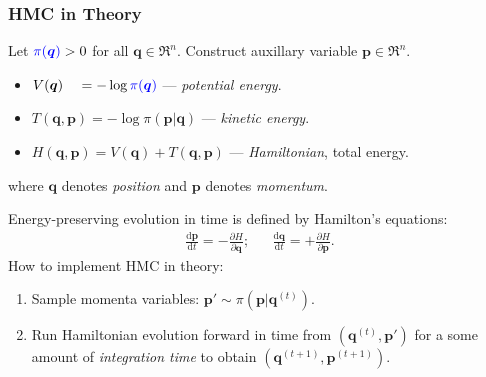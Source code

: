 \documentclass[xcolor=dvipsnames]{beamer}
\begin{document}
\begin{frame}
\frametitle{HMC in Theory}
Let ${\color{blue}\pi(\bm{q})}>0$ for all ${\bm{q}}\in\Re^n$. Construct auxillary variable $\bm{p}\in\Re^n$.
\begin{itemize}
\item[] $V({\bm{q}})\phantom{,\bm{p}} = -\log {\color{blue}\pi(\bm{q})}$ --- \emph{potential energy}.
\item[] $T({\bm{q}}, \bm{p}) = - \log \pi(\bm{p} | {\bm{q}})$ --- \emph{kinetic energy}.
\item[] $H({\bm{q}}, \bm{p}) = V({\bm{q}}) + T({\bm{q}}, \bm{p})$ --- \emph{Hamiltonian}, total energy.
\end{itemize}
where ${\bm{q}}$ denotes {\color{red}\emph{position}} and $\bm{p}$ denotes {\color{red}\emph{momentum}}.

\vspace{0.3cm}

Energy-preserving evolution in time is defined by Hamilton's equations:
\begin{align*}
\frac{\mathrm{d}\bm{p}}{\mathrm{d} t} = - \frac{\partial H}{\partial {\bm{q}}}; && \frac{\mathrm{d}{\bm{q}}}{\mathrm{d} t} = + \frac{\partial H}{\partial \bm{p}}.
\end{align*}
How to implement HMC in theory:
\begin{enumerate}
\item Sample momenta variables: $\bm{p}' \sim \pi(\bm{p}|\bm{q}^{(t)})$.
\item Run Hamiltonian evolution forward in time from $(\bm{q}^{(t)}, \bm{p}')$ for a some amount of {\color{red}\emph{integration time}} to obtain $(\bm{q}^{(t+1)}, \bm{p}^{(t+1)})$.
\end{enumerate}
\end{frame}
\end{document}

